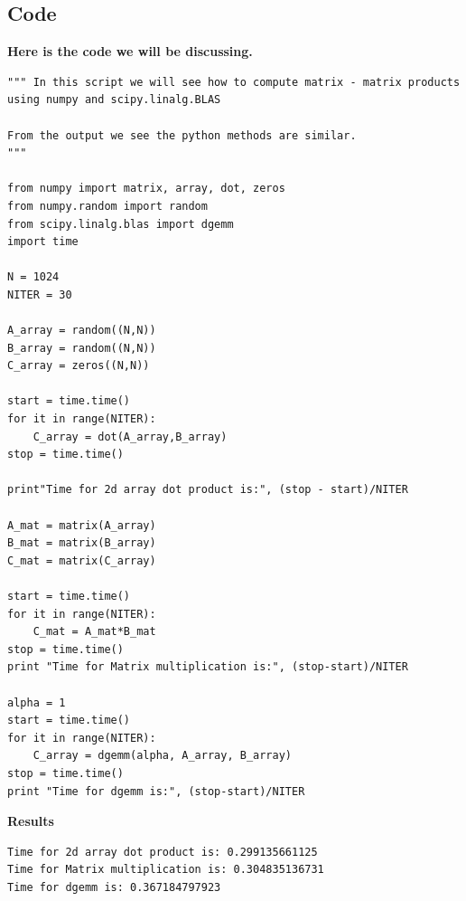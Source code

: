 \subsection{Code}
\begin{center}
\textbf{Here is the code we will be discussing.}
\begin{lstlisting}
""" In this script we will see how to compute matrix - matrix products
using numpy and scipy.linalg.BLAS 

From the output we see the python methods are similar.
"""

from numpy import matrix, array, dot, zeros
from numpy.random import random
from scipy.linalg.blas import dgemm
import time

N = 1024
NITER = 30

A_array = random((N,N))
B_array = random((N,N))
C_array = zeros((N,N))

start = time.time()
for it in range(NITER):
	C_array = dot(A_array,B_array)
stop = time.time()

print"Time for 2d array dot product is:", (stop - start)/NITER

A_mat = matrix(A_array)
B_mat = matrix(B_array)
C_mat = matrix(C_array)

start = time.time()
for it in range(NITER):
	C_mat = A_mat*B_mat
stop = time.time()
print "Time for Matrix multiplication is:", (stop-start)/NITER

alpha = 1
start = time.time()
for it in range(NITER):
	C_array = dgemm(alpha, A_array, B_array)
stop = time.time()
print "Time for dgemm is:", (stop-start)/NITER
\end{lstlisting}
\textbf{Results}
\begin{lstlisting}
Time for 2d array dot product is: 0.299135661125
Time for Matrix multiplication is: 0.304835136731
Time for dgemm is: 0.367184797923
\end{lstlisting}
\end{center}
